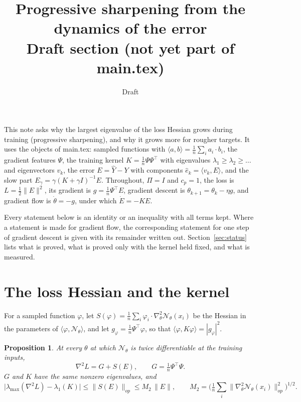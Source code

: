 \documentclass[11pt]{article}
\title{Progressive sharpening from the dynamics of the error\\[4pt]
\large Draft section (not yet part of main.tex)}
\author{Draft}
\date{}
\newtheorem{proposition}{Proposition}
\theoremstyle{definition}
\theoremstyle{remark}
\newcommand{\Net}{\mathcal{N}_\theta}
\newcommand{\ip}[2]{\langle #1,#2\rangle}
\begin{document}
\maketitle

\noindent
This note asks why the largest eigenvalue of the loss Hessian grows during training (progressive sharpening), and why it grows more for rougher targets.
It uses the objects of main.tex: sampled functions with $\ip{a}{b} = \frac1n\sum_i a_i\cdot b_i$, the gradient features $\Psi$, the training kernel $K = \frac1n\Psi\Psi^\top$ with eigenvalues $\lambda_1\ge\lambda_2\ge\dots$ and eigenvectors $v_k$, the error $E = \hat Y - Y$ with components $\hat e_k = \ip{v_k}{E}$, and the slow part $E_\gamma = \gamma(K+\gamma I)^{-1}E$.
Throughout, $\Pi = I$ and $c_p = 1$, the loss is $L = \frac12\|E\|^2$, its gradient is $g = \frac1n\Psi^\top E$, gradient descent is $\theta_{k+1} = \theta_k - \eta g$, and gradient flow is $\dot\theta = -g$, under which $\dot E = -KE$.

Every statement below is an identity or an inequality with all terms kept.
Where a statement is made for gradient flow, the corresponding statement for one step of gradient descent is given with its remainder written out.
Section~\ref{sec:status} lists what is proved, what is proved only with the kernel held fixed, and what is measured.

\section{The loss Hessian and the kernel}\label{sec:hess}

For a sampled function $\varphi$, let $S(\varphi) = \frac1n\sum_i\varphi_i\cdot\nabla^2_\theta\Net(x_i)$ be the Hessian in the parameters of $\ip{\varphi}{\Net}$, and let $g_\varphi = \frac1n\Psi^\top\varphi$, so that $\ip{\varphi}{K\varphi} = |g_\varphi|^2$.

\begin{proposition}\label{prop:hess}
At every $\theta$ at which $\Net$ is twice differentiable at the training inputs,
\begin{equation}\label{eq:hess}
\nabla^2 L = G + S(E),\qquad G = \tfrac1n\Psi^\top\Psi .
\end{equation}
$G$ and $K$ have the same nonzero eigenvalues, and
\begin{equation}\label{eq:hessK}
\big|\lambda_{\max}(\nabla^2L) - \lambda_1(K)\big| \le \|S(E)\|_{op} \le M_2\,\|E\|,\qquad M_2 = \Big(\tfrac1n\textstyle\sum_i\|\nabla^2_\theta\Net(x_i)\|_{op}^2\Big)^{1/2}.
\end{equation}
\end{proposition}
\end{document}
